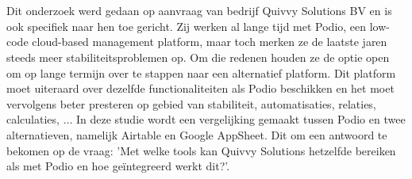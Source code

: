 
%
%
%
%

%



%

\chapter*{}

Dit onderzoek werd gedaan op aanvraag van bedrijf Quivvy Solutions BV en is ook specifiek naar hen toe gericht. Zij werken al lange tijd met Podio, een low-code cloud-based management platform, maar toch merken ze de laatste jaren steeds meer stabiliteitsproblemen op. Om die redenen houden ze de optie open om op lange termijn over te stappen naar een alternatief platform. Dit platform moet uiteraard over dezelfde functionaliteiten als Podio beschikken en het moet vervolgens beter presteren op gebied van stabiliteit, automatisaties, relaties, calculaties, $\ldots$ In deze studie wordt een vergelijking gemaakt tussen Podio en twee alternatieven, namelijk Airtable en Google AppSheet. Dit om een antwoord te bekomen op de vraag: 'Met welke tools kan Quivvy Solutions hetzelfde bereiken als met Podio en hoe geïntegreerd werkt dit?'. \\

